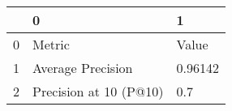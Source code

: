 \begin{tabular}{lll}
\toprule
{} &                       0 &        1 \\
\midrule
0 &                  Metric &    Value \\
1 &       Average Precision &  0.96142 \\
2 &  Precision at 10 (P@10) &      0.7 \\
\bottomrule
\end{tabular}
